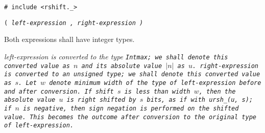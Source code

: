 
\tt{# include <rshift._>}

 \tt{(} \it{left-expression} \tt{,} \it{right-expression} \tt{)}


Both expressions shall have integer types.


\it{left-expression} is converted to the type \tt{Intmax};
we shall denote this converted value as $n$ and its absolute value $|n|$ as $u$.
\it{right-expression} is converted to an unsigned type;
we shall denote this converted value as $s$.
Let $w$ denote minimum width of the type of
\it{left-expression} before and after conversion.
If shift $s$ is less than width $w$, then the absolute value
$u$ is right shifted by $s$ bits, as if with \tt{ursh_(u, s)};
if $n$ is negative, then sign negation is performed on the shifted value.
This becomes the outcome after conversion
to the original type of \it{left-expression}.
